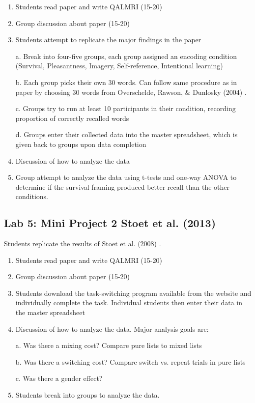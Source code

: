 \begin{enumerate}
\item Students read paper and write QALMRI (15-20)
\item Group discussion about paper (15-20)
\item	Students attempt to replicate the major findings in the paper

a.	Break into four-five groups, each group assigned an encoding condition (Survival, Pleasantness, Imagery, Self-reference, Intentional learning)

b.	Each group picks their own 30 words. Can follow same procedure as in paper by choosing 30 words from Overschelde, Rawson, \& Dunlosky (2004) \cite{van_overschelde_category_2004}.

c.	Groups try to run at least 10 participants in their condition, recording proportion of correctly recalled words

d.	Groups enter their collected data into the master spreadsheet, which is given back to groups upon data completion

\item Discussion of how to analyze the data
\item Group attempt to analyze the data using t-tests and one-way ANOVA to determine if the survival framing produced better recall than the other conditions.
\end{enumerate}

\subsection{Lab 5: Mini Project 2 Stoet et al. (2013)}

Students replicate the results of Stoet et al. (2008) \cite{stoet_are_2013}.

\begin{enumerate}
\item Students read paper and write QALMRI (15-20)
\item Group discussion about paper (15-20)
\item Students download the task-switching program available from the website and individually complete the task. Individual students then enter their data in the master spreadsheet
\item Discussion of how to analyze the data. Major analysis goals are:

a.	Was there a mixing cost? Compare pure lists to mixed lists

b.	Was there a switching cost? Compare switch vs. repeat trials in pure lists

c.	Was there a gender effect?

\item Students break into groups to analyze the data.
\end{enumerate}

